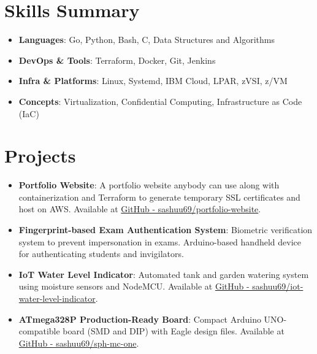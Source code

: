 \documentclass[a4paper,20pt]{article}
\newcommand{\resumeItem}[2]{
  \item\small{\textbf{#1}{: #2 \vspace{-2pt}}}
}
\newcommand{\resumeSubItem}[2]{\resumeItem{#1}{#2}\vspace{-3pt}}
\newcommand{\resumeSubHeadingListStart}{\begin{itemize}[leftmargin=*]}
\newcommand{\resumeSubHeadingListEnd}{\end{itemize}}
\begin{document}
\vspace{+5pt}
\section{Skills Summary}
    \resumeSubHeadingListStart
        \resumeSubItem{Languages}{Go, Python, Bash, C, Data Structures and Algorithms}
        \resumeSubItem{DevOps \& Tools}{Terraform, Docker, Git, Jenkins}
        \resumeSubItem{Infra \& Platforms}{Linux, Systemd, IBM Cloud, LPAR, zVSI, z/VM}
        \resumeSubItem{Concepts}{Virtualization, Confidential Computing, Infrastructure as Code (IaC)}
    \resumeSubHeadingListEnd

\vspace{+5pt}
\section{Projects}
    \resumeSubHeadingListStart
        \resumeSubItem
            {Portfolio Website}
            {A portfolio website anybody can use along with containerization and Terraform to generate temporary SSL certificates and host on AWS. Available at \href{https://github.com/sashuu69/portfolio-website}{GitHub - sashuu69/portfolio-website}.}
        \resumeSubItem
            {Fingerprint-based Exam Authentication System}
            {Biometric verification system to prevent impersonation in exams. Arduino-based handheld device for authenticating students and invigilators.}
        \resumeSubItem
            {IoT Water Level Indicator}
            {Automated tank and garden watering system using moisture sensors and NodeMCU. Available at \href{https://github.com/sashuu69/iot-water-level-indicator}{GitHub - sashuu69/iot-water-level-indicator}.}
        \resumeSubItem
            {ATmega328P Production-Ready Board}
            {Compact Arduino UNO-compatible board (SMD and DIP) with Eagle design files. Available at \href{https://github.com/sashuu69/sph-mc-one}{GitHub - sashuu69/sph-mc-one}.}
    \resumeSubHeadingListEnd

\vspace{+5pt}
\end{document}
